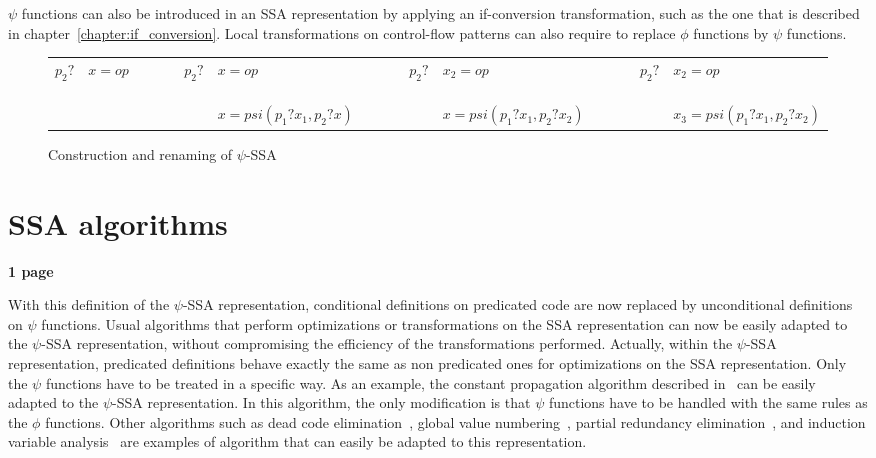 $\psi$ functions can also be introduced in an SSA representation by
applying an if-conversion transformation, such as the one that is
described in chapter~\ref{chapter:if_conversion}. Local transformations
on control-flow patterns can also require to replace $\phi$ functions
by $\psi$ functions.

\begin{figure}
\begin{center}
\footnotesize
\begin{tabular}{lllllllllll}
${p_2?}$ & ${x = op}$ & \ \ \ \  & ${p_2?}$ & ${x = op}$                  & \ \ \ \  & ${p_2?}$ & ${x_2 = op}$               & \ \ \ \  & ${p_2?}$ & ${x_2 = op}$ \\
             &                &          &              & ${x = psi(p_1?x_1, p_2?x)}$ &           &           & ${x = psi(p_1?x_1, p_2?x_2)}$ &          &           & ${x_3 = psi(p_1?x_1, p_2?x_2)}$ \\
\end{tabular}
\caption{Construction and renaming of $\psi$-SSA}
\label{fig:psi_ssa_construct}
\end{center}
\end{figure}


\section{SSA algorithms}

\textbf{1 page}


With this definition of the $\psi$-SSA representation, conditional
definitions on predicated code are now replaced by unconditional
definitions on $\psi$ functions. Usual algorithms that perform
optimizations or transformations on the SSA representation can now be
easily adapted to the $\psi$-SSA representation, without compromising
the efficiency of the transformations performed. Actually, within the
$\psi$-SSA representation, predicated definitions behave exactly the
same as non predicated ones for optimizations on the SSA
representation. Only the $\psi$ functions have to be treated in a
specific way. As an example, the constant propagation algorithm
described in~\cite{WZ91} can be easily adapted to the $\psi$-SSA
representation. In this algorithm, the only modification is that
$\psi$ functions have to be handled with the same rules as the $\phi$
functions. Other algorithms such as dead code
elimination~\cite{morgan98}, global value numbering~\cite{Cli95},
partial redundancy elimination~\cite{CCK+97}, and induction variable
analysis~\cite{Wolfe92} are examples of algorithm that can easily be
adapted to this representation.

